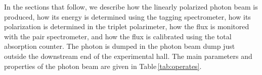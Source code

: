 In the sections that follow, we describe how the linearly polarized photon beam is produced, how its energy is determined using the tagging spectrometer, how its polarization is determined in the triplet polarimeter, how the flux is monitored with the pair spectrometer, and how the flux is calibrated using the total absorption counter.
The photon is dumped in the photon beam dump just outside the downstream end of the experimental hall.
The main parameters and properties of the photon beam are given in Table\,\ref{tab:operates}.
  



\begin{table}[tbp]
\begin{center}
\caption[Typical operating parameters for an experiment]{\label{tab:operates}
{\color{red}Note: The values in this table need to be checked!}
Typical operating parameters for an experiment using the coherent bremsstrahlung beam,
calculated with the properties
listed in Table \ref{tab:elecprop}, a diamond radiator of thickness 50~$\mu$m, and the standard
primary collimator of diameter 5.0~mm located at its nominal position.
The electron beam current is taken to 
be $150$~nA. The hadronic rates are calculated for 
a 30~cm liquid hydrogen target.}


\end{center}
\end{table}
